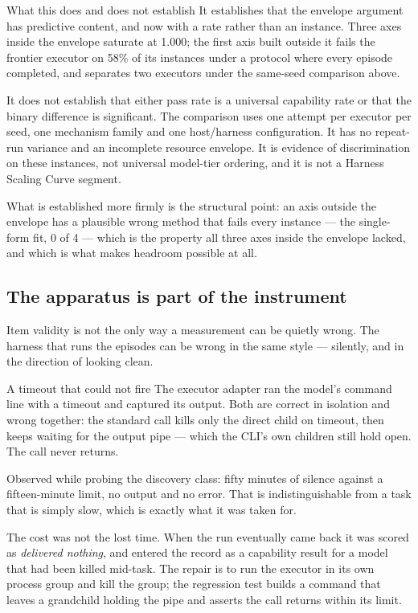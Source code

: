 \documentclass[11pt]{article}
\theoremstyle{definition}
\begin{document}
\begin{claimbox}{What this does and does not establish}
It establishes that the envelope argument has predictive content, and now with a rate rather than an instance. Three axes inside the envelope saturate at 1.000; the first axis built outside it fails the frontier executor on 58\% of its instances under a protocol where every episode completed, and separates two executors under the same-seed comparison above.

It does not establish that either pass rate is a universal capability rate or that the binary difference is significant. The comparison uses one attempt per executor per seed, one mechanism family and one host/harness configuration. It has no repeat-run variance and an incomplete resource envelope. It is evidence of discrimination on these instances, not universal model-tier ordering, and it is not a Harness Scaling Curve segment.
\end{claimbox}

What is established more firmly is the structural point: an axis outside the envelope has a plausible wrong method that fails every instance --- the single-form fit, 0 of 4 --- which is the property all three axes inside the envelope lacked, and which is what makes headroom possible at all.

\subsection{The apparatus is part of the instrument}\label{sec:apparatus}

Item validity is not the only way a measurement can be quietly wrong. The harness that runs the episodes can be wrong in the same style --- silently, and in the direction of looking clean.

\begin{cautionbox}{A timeout that could not fire}
The executor adapter ran the model's command line with a timeout and captured its output. Both are correct in isolation and wrong together: the standard call kills only the direct child on timeout, then keeps waiting for the output pipe --- which the CLI's own children still hold open. The call never returns.

Observed while probing the discovery class: fifty minutes of silence against a fifteen-minute limit, no output and no error. That is indistinguishable from a task that is simply slow, which is exactly what it was taken for.

The cost was not the lost time. When the run eventually came back it was scored as \emph{delivered nothing}, and entered the record as a capability result for a model that had been killed mid-task. The repair is to run the executor in its own process group and kill the group; the regression test builds a command that leaves a grandchild holding the pipe and asserts the call returns within its limit.
\end{cautionbox}
\end{document}
